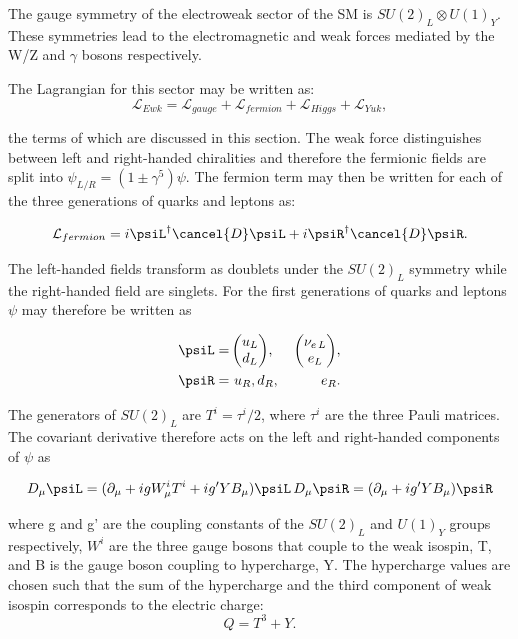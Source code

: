The gauge symmetry of the electroweak sector of the SM is $SU(2)_L\otimes U(1)_Y$. These symmetries lead
to the electromagnetic and weak forces mediated by the W/Z and $\gamma$ bosons respectively.

The Lagrangian for this sector may be written as:
\begin{equation}
\mathcal{L}_{Ewk} = \mathcal{L}_{gauge} + \mathcal{L}_{fermion} + \mathcal{L}_{Higgs} + \mathcal{L}_{Yuk},
\end{equation}

the terms of which are discussed in this section. The weak force distinguishes
between left and right-handed chiralities and therefore the fermionic fields are split into
$\psi_{L/R} = (1\pm\gamma^5)\psi$. The fermion term may then be written for each of the 
three generations of quarks and leptons as:

\begin{equation}
\mathcal{L}_{fermion} = i \psiL^{\dagger}\cancel{D}\psiL + i \psiR^{\dagger}\cancel{D}\psiR.
\end{equation}

The left-handed fields transform as doublets under the $SU(2)_L$ symmetry
while the right-handed field are singlets.
For the first generations of quarks and leptons $\psi$ may therefore be written as

\begin{align}
\qquad\qquad\qquad\psiL =\,&{\begin{pmatrix} u_L \\ d_L \end{pmatrix}},\, &{\begin{pmatrix} \nu_{e\,L} \\ e_L \end{pmatrix}},\nonumber\qquad\qquad\qquad\\
\qquad\qquad\qquad\psiR = \,&\,u_R,d_R,\, &\,e_R.\qquad\qquad\qquad
\end{align}

The generators of $SU(2)_L$ are $T^i = \tau^i/2$, where $\tau^i$ are the three Pauli matrices. 
The covariant derivative therefore acts on the left and right-handed components of $\psi$ as

\begin{equation}
D_{\mu} \psiL = (\partial_\mu + igW^i_{\mu}T^i + ig'YB_\mu)\psiL \, D_{\mu} \psiR = (\partial_\mu + ig'YB_\mu)\psiR
\end{equation}

where g and g' are the coupling constants of the $SU(2)_L$ and $U(1)_Y$ groups respectively, 
$W^i$ are the three gauge bosons that couple to the weak isospin, T, and B is the gauge boson
coupling to hypercharge, Y. The hypercharge values are chosen such that the sum of the hypercharge and 
the third component of weak isospin corresponds to the electric charge:
\begin{equation}
\label{equ:charge}
Q = T^{3} + Y.
\end{equation}

